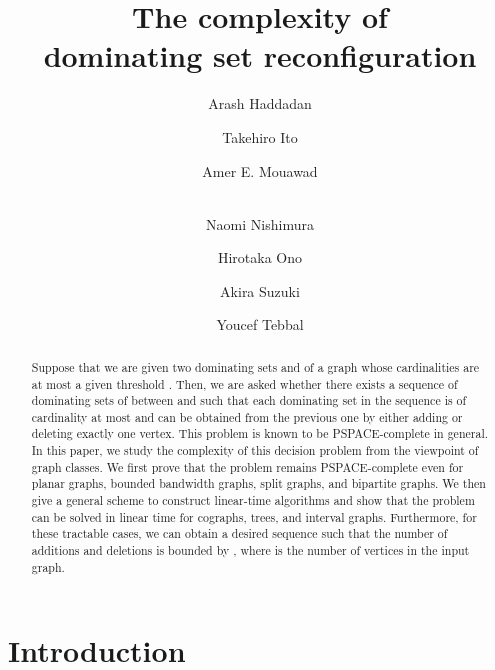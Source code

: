 \documentclass{llncs}
\begin{document}
	\title{The complexity of\\ dominating set reconfiguration}

\author{Arash Haddadan \and
	Takehiro Ito \and
	Amer E. Mouawad \and\\
	Naomi Nishimura \and
	Hirotaka Ono \and
	Akira Suzuki \and
	Youcef Tebbal
}


\maketitle

\begin{abstract}
Suppose that we are given two dominating sets  and  of a graph 
whose cardinalities are at most a given threshold .
Then, we are asked whether there exists a sequence of dominating sets of  between
 and  such that each dominating set in the sequence is of cardinality
at most  and can be obtained from the previous one by either adding or deleting exactly one vertex.
This problem is known to be PSPACE-complete in general.
In this paper, we study the complexity of this decision problem from the viewpoint of graph classes.
We first prove that the problem remains PSPACE-complete even for planar graphs, bounded bandwidth graphs, split graphs, and bipartite graphs.
We then give a general scheme to construct linear-time algorithms and show
that the problem can be solved in linear time for cographs, trees, and interval graphs.
Furthermore, for these tractable cases, we can obtain a desired sequence such
that the number of additions and deletions is bounded by , where  is the number of vertices in the input graph.
\end{abstract}

\section{Introduction}
\end{document}
